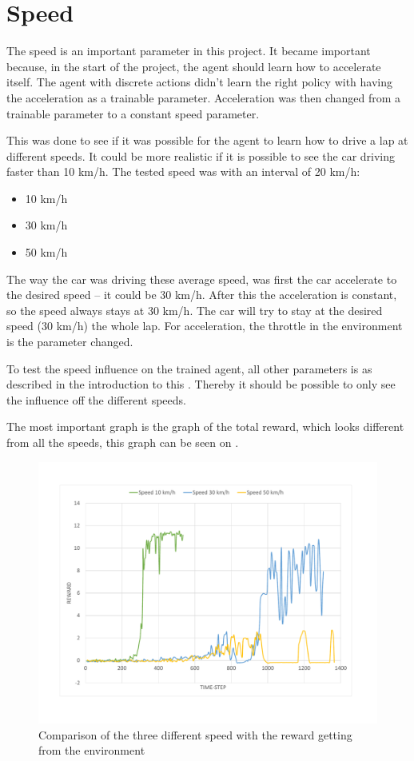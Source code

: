 \section{Speed}\label{sectionAcceleration}
The speed is an important parameter in this project. It became important because, in the start of the project, the agent should learn how to accelerate itself. The agent with discrete actions didn't learn the right policy with having the acceleration as a trainable parameter. Acceleration was then changed from a trainable parameter to a constant speed parameter. 

This was done to see if it was possible for the agent to learn how to drive a lap at different speeds. It could be more realistic if it is possible to see the car driving faster than 10 km/h. The tested speed was with an interval of 20 km/h: 
\begin{itemize}
	\item 10 km/h
	\item 30 km/h
	\item 50 km/h
\end{itemize} 

The way the car was driving these average speed, was first the car accelerate to the desired speed – it could be 30 km/h. After this the acceleration is constant, so the speed always stays at 30 km/h. The car will try to stay at the desired speed (30 km/h) the whole lap. For acceleration, the throttle in the environment is the parameter changed. 

To test the speed influence on the trained agent, all other parameters is as described in the introduction to this . Thereby it should be possible to only see the influence off the different speeds. 

The most important graph is the graph of the total reward, which looks different from all the speeds, this graph can be seen on .

\begin{figure}[H]
	\centering
	\includegraphics[width=1\textwidth]{Figures/Result/change_of_acceleration_reward_graph.pdf}
	\caption{Comparison of the three different speed with the reward getting from the environment}
	\label{fig:change_of_acceleration_reward_graph}
\end{figure} 

